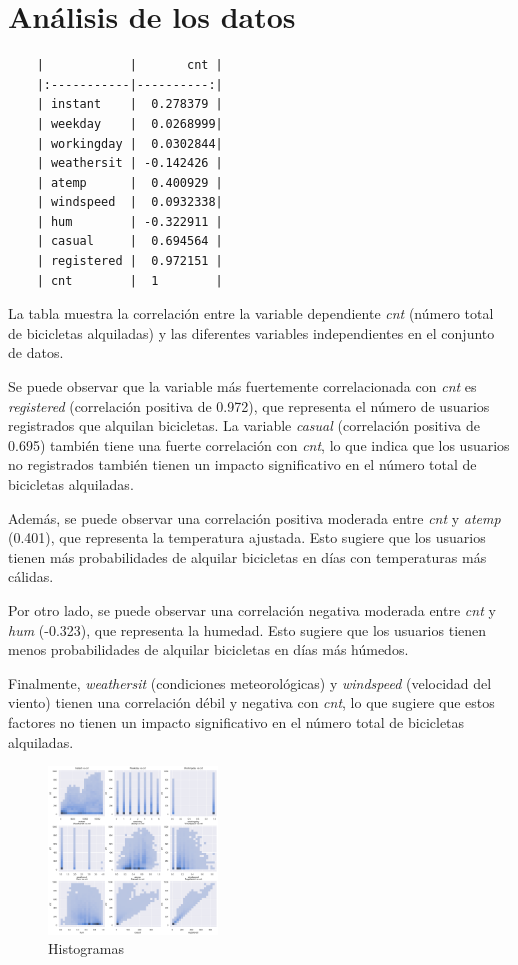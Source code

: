 \documentclass{wsdcr}
\begin{document}
\section{Análisis de los datos}

\begin{verbatim}
    |            |       cnt |
    |:-----------|----------:|
    | instant    |  0.278379 |
    | weekday    |  0.0268999|
    | workingday |  0.0302844|
    | weathersit | -0.142426 |
    | atemp      |  0.400929 |
    | windspeed  |  0.0932338|
    | hum        | -0.322911 |
    | casual     |  0.694564 |
    | registered |  0.972151 |
    | cnt        |  1        |
\end{verbatim}

La tabla muestra la correlación entre la variable dependiente \textit{cnt} (número total de bicicletas alquiladas) y las diferentes variables independientes en el conjunto de datos.

Se puede observar que la variable más fuertemente correlacionada con \textit{cnt} es \textit{registered} (correlación positiva de 0.972), que representa el número de usuarios registrados que alquilan bicicletas. La variable \textit{casual} (correlación positiva de 0.695) también tiene una fuerte correlación con \textit{cnt}, lo que indica que los usuarios no registrados también tienen un impacto significativo en el número total de bicicletas alquiladas.

Además, se puede observar una correlación positiva moderada entre \textit{cnt} y \textit{atemp} (0.401), que representa la temperatura ajustada. Esto sugiere que los usuarios tienen más probabilidades de alquilar bicicletas en días con temperaturas más cálidas.

Por otro lado, se puede observar una correlación negativa moderada entre \textit{cnt} y \textit{hum} (-0.323), que representa la humedad. Esto sugiere que los usuarios tienen menos probabilidades de alquilar bicicletas en días más húmedos.

Finalmente, \textit{weathersit} (condiciones meteorológicas) y \textit{windspeed} (velocidad del viento) tienen una correlación débil y negativa con \textit{cnt}, lo que sugiere que estos factores no tienen un impacto significativo en el número total de bicicletas alquiladas.


\begin{figure}[h]
    \centering
    \includegraphics[width=0.4\textwidth]{charts/histograms.png}
    \caption{Histogramas}
    \label{fig:histograms}
\end{figure}
\end{document}

